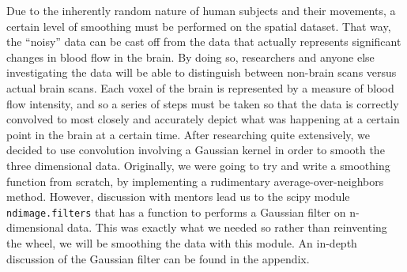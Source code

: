 \par \indent Due to the inherently random nature of human subjects and their 
movements, a certain level of smoothing must be performed on the spatial 
dataset. That way, the ``noisy'' data can be cast off from the data that 
actually represents significant changes in blood flow in the brain. By doing 
so, researchers and anyone else investigating the data will be able to 
distinguish between non-brain scans versus actual brain scans. Each voxel of 
the brain is represented by a measure of blood flow intensity, and so a 
series of steps must be taken so that the data is correctly convolved to most 
closely and accurately depict what was happening at a certain point in the 
brain at a certain time. After researching quite extensively, we decided to 
use convolution involving a Gaussian kernel in order to smooth the three 
dimensional data. Originally, we were going to try and write a smoothing 
function from scratch, by implementing a rudimentary average-over-neighbors 
method. However, discussion with mentors lead us to the scipy module 
\texttt{ndimage.filters} that has a function to performs a Gaussian filter on 
n-dimensional data. This was exactly what we needed so rather than reinventing 
the wheel, we will be smoothing the data with this module. An in-depth 
discussion of the Gaussian filter can be found in the appendix.
